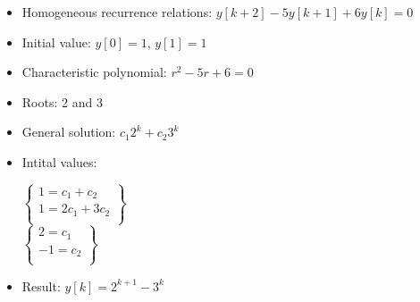 \begin{frame}
	\begin{example}
		
		\begin{itemize}
			\item Homogeneous recurrence relations: $y[k+2]-5y[k+1]+6y[k] = 0$
			\item Initial value: $y[0] =1$, $y[1] = 1$
			\item Characteristic polynomial: $r^2-5r+6=0$
			\item Roots: 2 and 3
			\item General solution: $c_1 2^k + c_2 3^k$
			\item Intital values: 
			\begin{center}
				$
				\begin{Bmatrix}
					1 = c_1 + c_2\\
					1 = 2c_1 + 3c_2\\
				\end{Bmatrix}
				$\\
					$
					\begin{Bmatrix}
					2 = c_1 \\
					-1 = c_2\\
					\end{Bmatrix}
					$\\
			\end{center}
			\item Result: $y[k] = 2^{k+1} - 3^{k}$
		\end{itemize}
	\end{example}
\end{frame}
